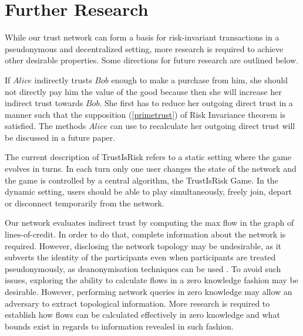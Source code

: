 \section{Further Research}

  While our trust network can form a basis for risk-invariant transactions in a pseudonymous and decentralized setting, more
  research is required to achieve other desirable properties. Some directions for future research are outlined below.

  If $Alice$ indirectly trusts $Bob$ enough to make a purchase from him, she should not directly pay him the value of the
  good because then she will increase her indirect trust towards $Bob$. She first has to reduce her outgoing direct trust in
  a manner such that the supposition (\ref{primetrust}) of Risk Invariance theorem is satisfied. The methods $Alice$ can use
  to recalculate her outgoing direct trust will be discussed in a future paper.

  The current description of TrustIsRisk refers to a static setting where the game evolves in turns. In each turn only one
  user changes the state of the network and the game is controlled by a central algorithm, the TrustIsRisk Game. In the
  dynamic setting, users should be able to play simultaneously, freely join, depart or disconnect temporarily from the
  network.

  Our network evaluates indirect trust by computing the max flow in the graph of lines-of-credit. In order to do that,
  complete information about the network is required. However, disclosing the network topology may be undesirable, as
  it subverts the identity of the participants even when participants are treated pseudonymously, as deanonymisation
  techniques can be used \cite{deanonymisation}. To avoid such issues, exploring the ability to calculate flows in a
  zero knowledge fashion may be desirable. However, performing network queries in zero knowledge may allow an adversary
  to extract topological information. More research is required to establish how flows can be calculated effectively in
  zero knowledge and what bounds exist in regards to information revealed in such fashion.

